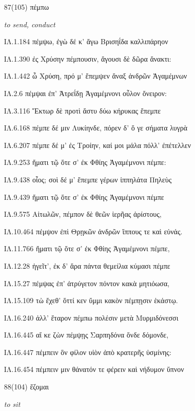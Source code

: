 \begin{enumerate}
{ΙΛ.11.285 Τρωσί τε καὶ Λυκίοισιν ἐκέκλετο μακρὸν ἀΰσας: 

}

\clearpage
\item[\large 87(105)]{\large \g πέμπω}

\hspace{0.2cm} \textit{ to send, conduct }

{\g
ΙΛ.1.184 πέμψω, ἐγὼ δέ κ' ἄγω Βρισηΐδα καλλιπάρηον 

ΙΛ.1.390 ἐς Χρύσην πέμπουσιν, ἄγουσι δὲ δῶρα ἄνακτι: 

ΙΛ.1.442 ὦ Χρύση, πρό μ' ἔπεμψεν ἄναξ ἀνδρῶν Ἀγαμέμνων 

ΙΛ.2.6 πέμψαι ἐπ' Ἀτρεΐδῃ Ἀγαμέμνονι οὖλον ὄνειρον: 

ΙΛ.3.116 Ἕκτωρ δὲ προτὶ ἄστυ δύω κήρυκας ἔπεμπε 

ΙΛ.6.168 πέμπε δέ μιν Λυκίηνδε, πόρεν δ' ὅ γε σήματα λυγρὰ 

ΙΛ.6.207 πέμπε δέ μ' ἐς Τροίην, καί μοι μάλα πόλλ' ἐπέτελλεν 

ΙΛ.9.253 ἤματι τῷ ὅτε σ' ἐκ Φθίης Ἀγαμέμνονι πέμπε: 

ΙΛ.9.438 οἶος; σοὶ δέ μ' ἔπεμπε γέρων ἱππηλάτα Πηλεὺς 

ΙΛ.9.439 ἤματι τῷ ὅτε σ' ἐκ Φθίης Ἀγαμέμνονι πέμπε 

ΙΛ.9.575 Αἰτωλῶν, πέμπον δὲ θεῶν ἱερῆας ἀρίστους, 

ΙΛ.10.464 πέμψον ἐπὶ Θρῃκῶν ἀνδρῶν ἵππους τε καὶ εὐνάς. 

ΙΛ.11.766 ἤματι τῷ ὅτε σ' ἐκ Φθίης Ἀγαμέμνονι πέμπε, 

ΙΛ.12.28 ἡγεῖτ', ἐκ δ' ἄρα πάντα θεμείλια κύμασι πέμπε 

ΙΛ.15.27 πέμψας ἐπ' ἀτρύγετον πόντον κακὰ μητιόωσα, 

ΙΛ.15.109 τὼ ἔχεθ' ὅττί κεν ὔμμι κακὸν πέμπῃσιν ἑκάστῳ. 

ΙΛ.16.240 ἀλλ' ἕταρον πέμπω πολέσιν μετὰ Μυρμιδόνεσσι 

ΙΛ.16.445 αἴ κε ζὼν πέμψῃς Σαρπηδόνα ὅνδε δόμονδε, 

ΙΛ.16.447 πέμπειν ὃν φίλον υἱὸν ἀπὸ κρατερῆς ὑσμίνης: 

ΙΛ.16.454 πέμπειν μιν θάνατόν τε φέρειν καὶ νήδυμον ὕπνον 

}

\clearpage
\item[\large 88(104)]{\large \g ἕζομαι}

\hspace{0.2cm} \textit{ to sit }


\end{enumerate}
